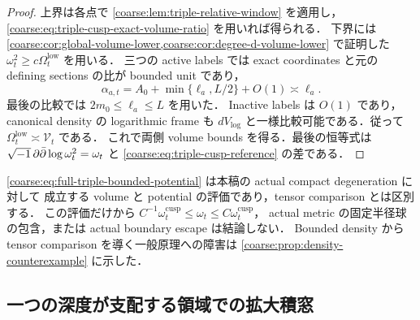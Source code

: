 \begin{proof}
上界は各点で \cref{coarse:lem:triple-relative-window} を適用し，
\eqref{coarse:eq:triple-cusp-exact-volume-ratio} を用いれば得られる．
下界には \cref{coarse:cor:global-volume-lower,coarse:cor:degree-d-volume-lower} で証明した
$\omega_t^2\ge c\Omega_t^{\mathrm{low}}$ を用いる．
三つの active labels では exact coordinates と元の defining sections の比が bounded unit であり，
\[
 \alpha_{a,t}=A_0+\min\{\ell_a,L/2\}+O(1)
 \asymp\ell_a.
\]
最後の比較では $2m_0\le\ell_a\le L$ を用いた．
Inactive labels は $O(1)$ であり，canonical density の logarithmic frame も
$dV_{\log}$ と一様比較可能である．従って
$\Omega_t^{\mathrm{low}}\asymp\mathcal V_t$ である．
これで両側 volume bounds を得る．最後の恒等式は
$\sqrt{-1}\,\partial\bar\partial\log\omega_t^2=\omega_t$ と
\eqref{coarse:eq:triple-cusp-reference} の差である．
\end{proof}

\begin{remark}\label{coarse:rem:triple-volume-not-tensor}
\eqref{coarse:eq:full-triple-bounded-potential} は本稿の actual compact degeneration に対して
成立する volume と potential の評価であり，tensor comparison とは区別する．
この評価だけから $C^{-1}\omega_t^{\mathrm{cusp}}\le\omega_t\le C\omega_t^{\mathrm{cusp}}$，
actual metric の固定半径球の包含，または actual boundary escape は結論しない．
Bounded density から tensor comparison を導く一般原理への障害は
\cref{coarse:prop:density-counterexample} に示した．
\end{remark}

\subsection{一つの深度が支配する領域での拡大積窓}

